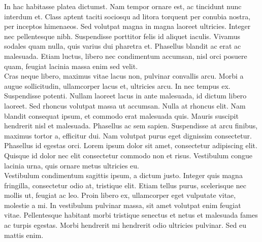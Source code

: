 In hac habitasse platea dictumst. Nam tempor ornare est, ac tincidunt nunc interdum et. Class aptent taciti sociosqu ad litora torquent per conubia nostra, per inceptos himenaeos. Sed volutpat magna in magna laoreet ultricies. Integer nec pellentesque nibh. Suspendisse porttitor felis id aliquet iaculis. Vivamus sodales quam nulla, quis varius dui pharetra et. Phasellus blandit ac erat ac malesuada. Etiam luctus, libero nec condimentum accumsan, nisl orci posuere quam, feugiat lacinia massa enim sed velit.\\
Cras neque libero, maximus vitae lacus non, pulvinar convallis arcu. Morbi a augue sollicitudin, ullamcorper lacus et, ultricies arcu. In nec tempus ex. Suspendisse potenti. Nullam laoreet lacus in ante malesuada, id dictum libero laoreet. Sed rhoncus volutpat massa ut accumsan. Nulla at rhoncus elit. Nam blandit consequat ipsum, et commodo erat malesuada quis. Mauris suscipit hendrerit nisl et malesuada. Phasellus ac sem sapien. Suspendisse at arcu finibus, maximus tortor a, efficitur dui. Nam volutpat purus eget dignissim consectetur. Phasellus id egestas orci. Lorem ipsum dolor sit amet, consectetur adipiscing elit. Quisque id dolor nec elit consectetur commodo non et risus. Vestibulum congue lacinia urna, quis ornare metus ultricies eu.\\
Vestibulum condimentum sagittis ipsum, a dictum justo. Integer quis magna fringilla, consectetur odio at, tristique elit. Etiam tellus purus, scelerisque nec mollis ut, feugiat ac leo. Proin libero ex, ullamcorper eget vulputate vitae, molestie a mi. In vestibulum pulvinar massa, sit amet volutpat enim feugiat vitae. Pellentesque habitant morbi tristique senectus et netus et malesuada fames ac turpis egestas. Morbi hendrerit mi hendrerit odio ultricies pulvinar. Sed eu mattis enim.
\newpage
